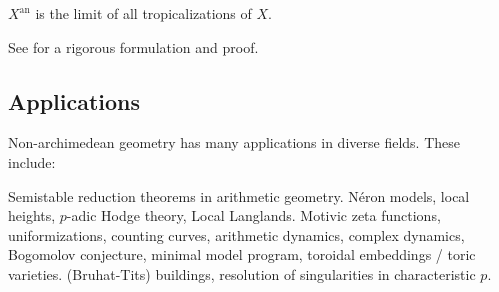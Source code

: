 \begin{theorem}\label{thm:limit-tropicalizations}
$X^\mathrm{an}$ is the limit of all tropicalizations of $X$. 
\end{theorem}

See \cite{payne-2009} for a rigorous formulation and proof. 





\subsection{Applications}

Non-archimedean geometry has many applications in diverse fields. These 
include: 

Semistable reduction theorems in arithmetic geometry. N\'eron models, 
local heights, $p$-adic Hodge theory, Local Langlands. Motivic zeta 
functions, uniformizations, counting curves, arithmetic dynamics, 
complex dynamics, Bogomolov conjecture, minimal model program, 
toroidal embeddings / toric varieties. (Bruhat-Tits) buildings, resolution 
of singularities in characteristic $p$. 




